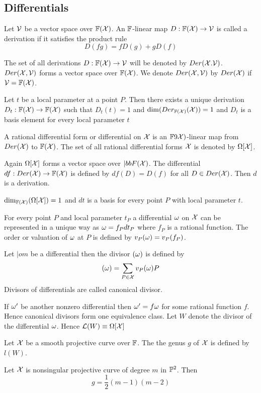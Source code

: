 \subsection{Differentials}
\begin{definition}[Derivation]
	Let $\mathcal{V}$ be a vector space over $\mathbb{F}(\mathcal{X})$. An $\mathbb{F}$-linear map $D:\mathbb{F}(\mathcal{X})\to\mathcal{V}$ is called a derivation if it satisfies the product rule $$D(fg)=fD(g)+gD(f)$$
\end{definition}
The set of all derivations $D:\mathbb{F}(\mathcal{X})\to\mathcal{V}$ will be denoted by $Der(\mathcal{X}.\mathcal{V})$. $Der(\mathcal{X},\mathcal{V})$ forms a vector space over $\mathbb{F}(\mathcal{X})$. We denote $Der(\mathcal{X},\mathcal{V})$ by $Der(\mathcal{X})$ if $\mathcal{V}=\mathbb{F}(\mathcal{X})$. 
\begin{theorem}
	Let $t$ be a local parameter at a point $P$. Then there exists a unique derivation $D_t:\mathbb{F}(\mathcal{X})\to \mathbb{F}(\mathcal{X})$  such that $D_t(t)=1$ and $\dim(Der_{\mathbb{F}(\mathcal{X})}(\mathcal{X}))=1$ and $D_t$ is a basis element for every local parameter $t$
\end{theorem}
\begin{definition}[Differential]
	A rational differential form or differential on $\mathcal{X}$ is an $\mathbb{F}9\mathcal{X})$-linear map from $Der(\mathcal{X})$ to $\mathbb{F}(\mathcal{X})$. The set of all rational differential forms $\mathcal{X}$ is denoted by $\Omega[\mathcal{X}]$.
\end{definition}
Again $\Omega[\mathcal{X}]$ forms a vector space over $|bbF(\mathcal{X})$. The differential $df:Der(\mathcal{X})\to \mathbb{F}(\mathcal{X})$ is defined by $df(D)=D(f)$ for all $D\in Der(\mathcal{X})$. Then $d$ is a derivation.
\begin{theorem}
	$\dim_{\mathbb{F}(\mathcal{X})}(\Omega[\mathcal{X}])=1$ and $dt$ is a basis for every point $P$ with local parameter $t$.
\end{theorem}
For every point $P$ and local parameter $t_P$ a differential  $\omega$ on $\mathcal{X}$ can be represented in a unique way as $\omega=f_Pdt_P$ where $f_P$ is a rational function. The order or valuation of $\omega$ at $P$ is defined by $v_P(\omega)=v_P(f_P)$.
\begin{definition}
	Let $|om$ be a differential then the divisor $(\omega)$ is defined by $$(\omega)=\sum_{P\in \mathcal{X}}v_P(\omega)P$$Divisors of differentials are called canonical divisor. 
\end{definition}
If $\omega'$ be another nonzero differential then $\omega'=f\omega$ for some rational function $f$. Hence canonical divisors form one equivalence class. Let $W$ denote the divisor of the differential $\omega$. Hence  $\mathcal{L}(W)\equiv \Omega[\mathcal{X}]$
\begin{definition}
	Let $\mathcal{X}$ be a smooth projective curve over $\mathbb{F}$. The the genus $g$ of $\mathcal{X}$ is defined by $l(W)$.
\end{definition}
\begin{theorem}
	Let $\mathcal{X}$ is nonsingular projective curve of degree $m$ in $\mathbb{P}^2$. Then $$g=\frac12(m-1)(m-2)$$
\end{theorem}


